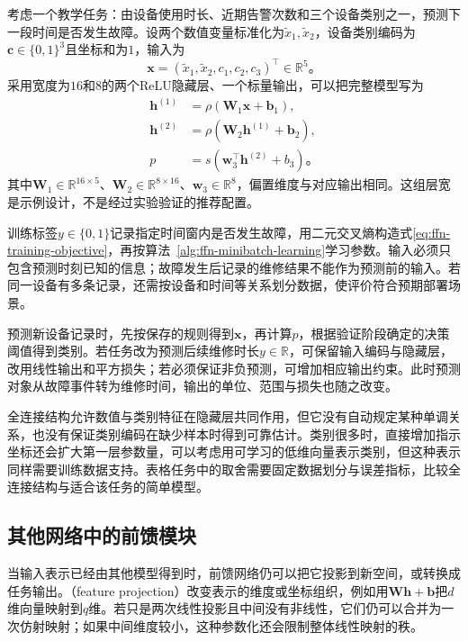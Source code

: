 考虑一个教学任务：由设备使用时长、近期告警次数和三个设备类别之一，预测下一段时间是否发生故障。设两个数值变量标准化为$\widetilde x_1,\widetilde x_2$，设备类别编码为$\bm{c}\in\{0,1\}^{3}$且坐标和为$1$，输入为
\[
  \bm{x}=(\widetilde x_1,\widetilde x_2,c_1,c_2,c_3)^{\top}
  \in\mathbb{R}^{5}\text{。}
\]
采用宽度为$16$和$8$的两个ReLU隐藏层、一个标量输出，可以把完整模型写为
\begin{equation}
  \begin{aligned}
    \bm{h}^{(1)}&=\rho(\bm{W}_1\bm{x}+\bm{b}_1),\\
    \bm{h}^{(2)}&=\rho(\bm{W}_2\bm{h}^{(1)}+\bm{b}_2),\\
    p&=s(\bm{w}_3^{\top}\bm{h}^{(2)}+b_3)\text{。}
  \end{aligned}
  \label{eq:ffn-tabular-classifier}
\end{equation}
其中$\bm{W}_1\in\mathbb{R}^{16\times5}$、$\bm{W}_2\in\mathbb{R}^{8\times16}$、$\bm{w}_3\in\mathbb{R}^{8}$，偏置维度与对应输出相同。这组层宽是示例设计，不是经过实验验证的推荐配置。

训练标签$y\in\{0,1\}$记录指定时间窗内是否发生故障，用二元交叉熵构造式\eqref{eq:ffn-training-objective}，再按算法~\ref{alg:ffn-minibatch-learning}学习参数。输入必须只包含预测时刻已知的信息；故障发生后记录的维修结果不能作为预测前的输入。若同一设备有多条记录，还需按设备和时间等关系划分数据，使评价符合预期部署场景。

预测新设备记录时，先按保存的规则得到$\bm{x}$，再计算$p$，根据验证阶段确定的决策阈值得到类别。若任务改为预测后续维修时长$y\in\mathbb{R}$，可保留输入编码与隐藏层，改用线性输出和平方损失；若必须保证非负预测，可增加相应输出约束。此时预测对象从故障事件转为维修时间，输出的单位、范围与损失也随之改变。

全连接结构允许数值与类别特征在隐藏层共同作用，但它没有自动规定某种单调关系，也没有保证类别编码在缺少样本时得到可靠估计。类别很多时，直接增加指示坐标还会扩大第一层参数量，可以考虑用可学习的低维向量表示类别，但这种表示同样需要训练数据支持。表格任务中的取舍需要固定数据划分与误差指标，比较全连接结构与适合该任务的简单模型。

\subsection{其他网络中的前馈模块}
\label{sec:ffn-modules}

当输入表示已经由其他模型得到时，前馈网络仍可以把它投影到新空间，或转换成任务输出。（feature projection）改变表示的维度或坐标组织，例如用$\bm{W}\bm{h}+\bm{b}$把$d$维向量映射到$q$维。若只是两次线性投影且中间没有非线性，它们仍可以合并为一次仿射映射；如果中间维度较小，这种参数化还会限制整体线性映射的秩。

